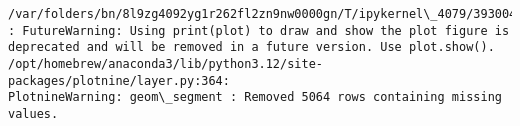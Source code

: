\documentclass[11pt]{article}
\begin{document}
    \begin{Verbatim}[commandchars=\\\{\}]
/var/folders/bn/8l9zg4092yg1r262fl2zn9nw0000gn/T/ipykernel\_4079/3930044355.py:28
: FutureWarning: Using print(plot) to draw and show the plot figure is
deprecated and will be removed in a future version. Use plot.show().
/opt/homebrew/anaconda3/lib/python3.12/site-packages/plotnine/layer.py:364:
PlotnineWarning: geom\_segment : Removed 5064 rows containing missing values.
    \end{Verbatim}

    \begin{center}
    \end{center}
    { \hspace*{\fill} \\}
    
    \begin{Verbatim}[commandchars=\\\{\}]

    \end{Verbatim}
\end{document}
